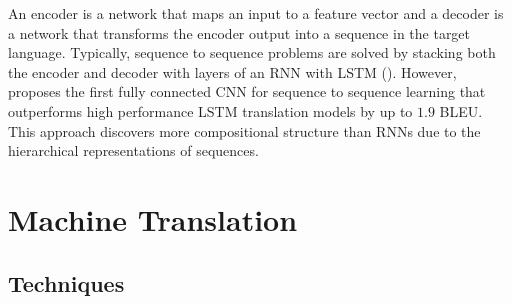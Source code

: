 % 




An encoder is a network that maps an input to a feature vector and a decoder is a network that transforms the encoder output into a sequence in the target language. Typically, sequence to sequence problems are solved by stacking both the encoder and decoder with layers of an RNN with \acrshort{LSTM} (\cite{luong_effective_2015}). However, \cite{gehring_convolutional_2017} proposes the first fully connected \acrshort{CNN} for sequence to sequence learning that outperforms high performance \acrshort{LSTM} translation models by up to $1.9$ \acrshort{BLEU}. This approach discovers more compositional structure than \acrshort{RNN}s due to the hierarchical representations of sequences.



\section{Machine Translation}
\label{Machine Translation}

\subsection{Techniques}




